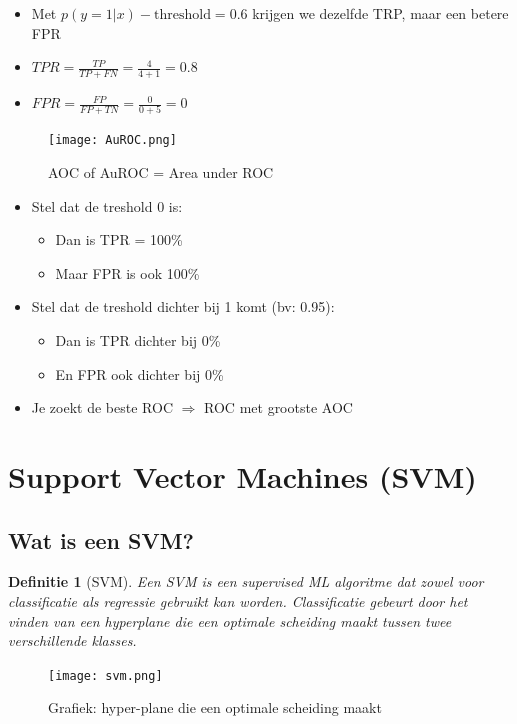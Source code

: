 \documentclass{article}
\newtheorem{theorem}{Definitie}[section]
\begin{document}
\begin{itemize}
    \item Met $p(y=1 | x) - \text{threshold} = 0.6$ krijgen we dezelfde TRP, maar een betere FPR
    \item $TPR = \frac{TP}{TP + FN} = \frac{4}{4 + 1} = 0.8$
    \item $FPR = \frac{FP}{FP + TN} = \frac{0}{0 + 5} = 0$
\end{itemize}

\begin{figure}[H]
    \centering
    \texttt{[image: AuROC.png]}
    \caption{AOC of AuROC = Area under ROC}
\end{figure}

\begin{itemize}
    \item Stel dat de treshold 0 is:
    \begin{itemize}
        \item Dan is TPR = 100\%
        \item Maar FPR is ook 100\%
    \end{itemize}
    \item Stel dat de treshold dichter bij 1 komt (bv: 0.95):
    \begin{itemize}
        \item Dan is TPR dichter bij 0\%
        \item En FPR ook dichter bij 0\%
    \end{itemize}
    \item Je zoekt de beste ROC $\Rightarrow$ ROC met grootste AOC
\end{itemize}

\section{Support Vector Machines (SVM)}

\subsection{Wat is een SVM?}

\begin{theorem}[SVM]
Een SVM is een supervised ML algoritme dat zowel voor classificatie als regressie
gebruikt kan worden. Classificatie gebeurt door het vinden van een hyperplane die
een optimale scheiding maakt tussen twee verschillende klasses.
\end{theorem}

\begin{figure}[H]
    \centering
    \texttt{[image: svm.png]}
    \caption{Grafiek: hyper-plane die een optimale scheiding maakt}
\end{figure}
\end{document}
